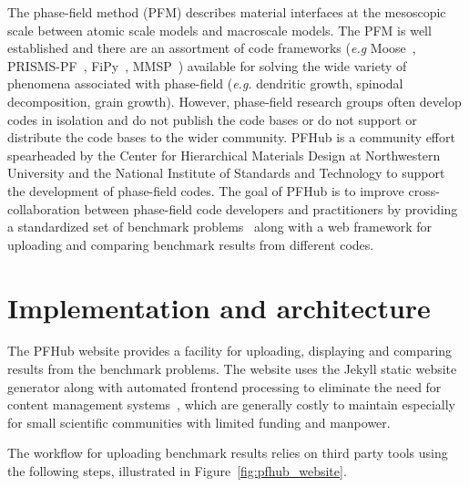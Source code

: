 \documentclass{jors}
\begin{document}
The phase-field method (PFM) describes material interfaces at the
mesoscopic scale between atomic scale models and macroscale models.
The PFM is well established and there are an assortment of code
frameworks (\textit{e.g} Moose~\cite{moose},
PRISMS-PF~\cite{prisms-pf}, FiPy~\cite{fipy}, MMSP~\cite{mmsp})
available for solving the wide variety of phenomena associated with
phase-field (\textit{e.g.} dendritic growth, spinodal decomposition,
grain growth). However, phase-field research groups often develop
codes in isolation and do not publish the code bases or do not support
or distribute the code bases to the wider community. PFHub is a
community effort spearheaded by the Center for Hierarchical Materials
Design at Northwestern University and the National Institute of
Standards and Technology to support the development of phase-field
codes. The goal of PFHub is to improve cross-collaboration between
phase-field code developers and practitioners by providing a
standardized set of benchmark problems~\cite{bm1, bm2} along with a
web framework for uploading and comparing benchmark results from
different codes.

\section*{Implementation and architecture}

The PFHub website provides a facility for uploading, displaying and
comparing results from the benchmark problems. The website uses the
Jekyll static website generator along with automated frontend
processing to eliminate the need for content management
systems~\cite{cmsfree}, which are generally costly to maintain
especially for small scientific communities with limited funding and
manpower.

The workflow for uploading benchmark results relies on third party
tools using the following steps, illustrated in
Figure~\ref{fig:pfhub_website}.
\end{document}
